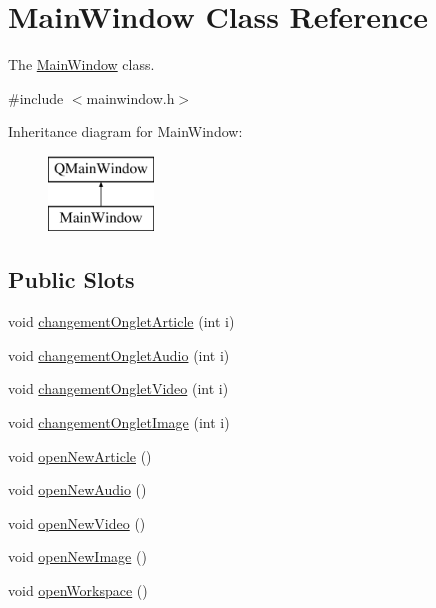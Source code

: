 \hypertarget{class_main_window}{\section{Main\-Window Class Reference}
\label{class_main_window}
}


The \hyperlink{class_main_window}{Main\-Window} class.  




{\ttfamily \#include $<$mainwindow.\-h$>$}

Inheritance diagram for Main\-Window\-:\begin{figure}[H]
\begin{center}
\leavevmode
\includegraphics[height=2.000000cm]{class_main_window}
\end{center}
\end{figure}
\subsection*{Public Slots}
\begin{DoxyCompactItemize}
\item 
void \hyperlink{class_main_window_a6306517b1a6f19fdc724cf9ad66b1bae}{changement\-Onglet\-Article} (int i)
\item 
void \hyperlink{class_main_window_acdb0234f0b46aea6f536efd6942c650d}{changement\-Onglet\-Audio} (int i)
\item 
void \hyperlink{class_main_window_ac475ed7d0148bddb7c47154a4daab9b4}{changement\-Onglet\-Video} (int i)
\item 
void \hyperlink{class_main_window_a22c982a03cf55f05f0169697850b6c43}{changement\-Onglet\-Image} (int i)
\item 
void \hyperlink{class_main_window_ac5d551e28b0f424756b94b06d2b569da}{open\-New\-Article} ()
\item 
void \hyperlink{class_main_window_acf1101508b993fd46011d9005cf9d8ed}{open\-New\-Audio} ()
\item 
void \hyperlink{class_main_window_a33c3fd6e0ed262c2c71193f6b148a349}{open\-New\-Video} ()
\item 
void \hyperlink{class_main_window_a9f188ec187e2a0f931d76125302717f3}{open\-New\-Image} ()
\item 
void \hyperlink{class_main_window_a8539f197a0dcd9e33cf7d7ce174869a4}{open\-Workspace} ()
\end{DoxyCompactItemize}
